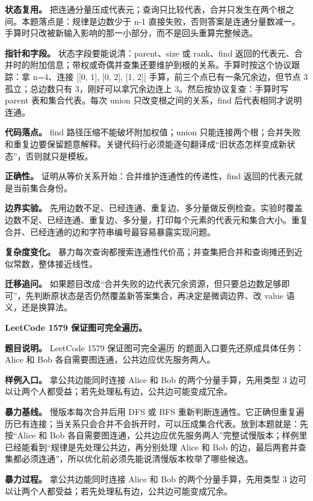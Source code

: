 \textbf{状态复用。} 把连通分量压成代表元；查询只比较代表，合并只发生在两个根之间。本题落点是：规律是边数少于 n-1 直接失败，否则答案是连通分量数减一。手算时只改被新输入影响的那一小部分，而不是回头重算完整候选。

\textbf{指针和字段。} 状态字段要能说清：parent、size 或 rank、find 返回的代表元、合并时的附加信息；带权或奇偶并查集还要维护到根的关系。手算时按这个协议跟踪：拿 n=4、连接 [[0, 1], [0, 2], [1, 2]] 手算，前三个点已有一条冗余边，但节点 3 孤立；总边数只有 3，刚好可以拿冗余边连上 3。然后按协议复查：手算时写 parent 表和集合代表。每次 union 只改变根之间的关系，find 后代表相同才说明连通。

\textbf{代码落点。} find 路径压缩不能破坏附加权值；union 只能连接两个根；合并失败和重复边要保留题意解释。关键代码行必须能逐句翻译成“旧状态怎样变成新状态”，否则就只是模板。

\textbf{正确性。} 证明从等价关系开始：合并维护连通性的传递性，find 返回的代表元就是当前集合身份。

\textbf{边界实验。} 先用边数不足、已经连通、重复边、多分量做反例检查。实验时覆盖边数不足、已经连通、重复边、多分量，打印每个元素的代表元和集合大小。重复合并、已经连通的边和字符串编号最容易暴露实现问题。

\textbf{复杂度变化。} 暴力每次查询都搜索连通性代价高；并查集把合并和查询摊还到近似常数，整体接近线性。

\textbf{迁移追问。} 如果题目改成“合并失败的边代表冗余资源，但只要总边数足够即可”，先判断原状态是否仍然覆盖新答案集合，再决定是微调边界、改 value 语义，还是换算法。

\noindent\textbf{LeetCode 1579 保证图可完全遍历。}

\textbf{题目说明。} LeetCode 1579 保证图可完全遍历 的题面入口要先还原成具体任务：Alice 和 Bob 各自需要图连通，公共边应优先服务两人。

\textbf{样例入口。} 拿公共边能同时连接 Alice 和 Bob 的两个分量手算，先用类型 3 边可以让两个人都受益；若先处理私有边，公共边可能变成冗余。

\textbf{暴力基线。} 慢版本每次合并后用 DFS 或 BFS 重新判断连通性。它正确但重复遍历已有连接；当关系只会合并不会拆开时，可以压成集合代表。放到本题就是：先按“Alice 和 Bob 各自需要图连通，公共边应优先服务两人”完整试慢版本；样例里已经能看到“规律是先处理公共边，再分别处理 Alice 和 Bob 的边，最后两套并查集都必须连通”，所以优化前必须先能说清慢版本枚举了哪些候选。

\textbf{暴力过程。} 拿公共边能同时连接 Alice 和 Bob 的两个分量手算，先用类型 3 边可以让两个人都受益；若先处理私有边，公共边可能变成冗余。

